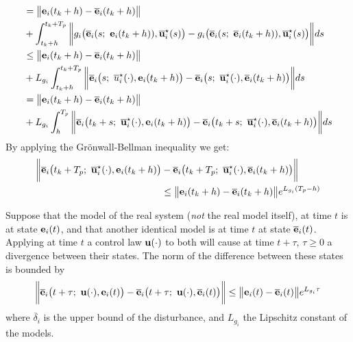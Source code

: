 \begin{gg_box}
\begin{align}
  &= \big \| \vect{e}_i(t_k +h) - \overline{\vect{e}}_i(t_k +h) \big \| \\
  &+ \int_{t_k +h}^{t_k + T_p} \bigg\| g_i\big(\overline{\vect{e}}_i(s;\ \vect{e}_i(t_k + h)), \overline{\vect{u}}_i^{\star}(s)\big)
  - g_i\big(\overline{\vect{e}}_i(s;\ \overline{\vect{e}}_i(t_k + h)), \overline{\vect{u}}_i^{\star}(s)\big) \bigg\| ds \\
  &\leq \big \| \vect{e}_i(t_k +h) - \overline{\vect{e}}_i(t_k +h) \big \| \\
  &+ L_{g_i}\int_{t_k +h}^{t_k + T_p} \bigg\| \overline{\vect{e}}_i\big(s;\ \overline{\vect{}u}_i^{\star}(\cdot), \vect{e}_i(t_k + h) \big)
    - \overline{\vect{e}}_i\big(s;\ \overline{\vect{u}}_i^{\star}(\cdot), \overline{\vect{e}}_i(t_k + h)\big)  \bigg\| ds \\
  &= \big \| \vect{e}_i(t_k +h) - \overline{\vect{e}}_i(t_k +h) \big \| \\
  &+ L_{g_i}\int_{h}^{T_p} \bigg\| \overline{\vect{e}}_i\big(t_k + s;\ \overline{\vect{u}}_i^{\star}(\cdot), \vect{e}_i(t_k + h) \big)
    - \overline{\vect{e}}_i\big(t_k + s;\ \overline{\vect{u}}_i^{\star}(\cdot), \overline{\vect{e}}_i(t_k + h)\big)  \bigg\| ds \\
\end{align}
By applying the Gr\"{o}nwall-Bellman inequality we get:
\begin{align}
  \bigg\| \overline{\vect{e}}_i\big(t_k + T_p;\ \overline{\vect{u}}_i^{\star}(\cdot), \vect{e}_i(t_k +h)\big)
    & - \overline{\vect{e}}_i\big(t_k + T_p;\ \overline{\vect{u}}_i^{\star}(\cdot), \overline{\vect{e}}_i(t_k +h)\big) \bigg\| \\
  & \leq \big \| \vect{e}_i(t_k +h) - \overline{\vect{e}}_i(t_k +h) \big \| e^{L_{g_i}(T_p - h)}
\end{align}
\end{gg_box}


\begin{bw_box}
  \begin{lemma}
    Suppose that the model of the real system (\textit{not} the real model itself),
    at time $t$ is at state $\bm{\mathbf{e}}_i(t)$, and that another identical
    model is at time $t$ at state $\overline{\bm{\mathbf{e}}}_i(t)$. Applying at
    time $t$ a control law $\bm{\mathbf{u}}(\cdot)$ to both will cause at time
    $t + \tau$, $\tau \geq 0$ a divergence between their states.
    The norm of the difference between these states is bounded by
    \begin{align}
      \bigg\| \overline{\bm{\mathbf{e}}}_i\big(t + \tau;\ \bm{\mathbf{u}}(\cdot), \bm{\mathbf{e}}_i(t)\big) -
        \overline{\bm{\mathbf{e}}}_i\big(t + \tau;\ \bm{\mathbf{u}}(\cdot), \overline{\bm{\mathbf{e}}}_i(t)\big) \bigg\|
        \leq \big\| \bm{\mathbf{e}}_i(t) - \overline{\bm{\mathbf{e}}}_i(t) \big\| e^{L_{g_i}\tau}
    \end{align}
    where $\overline{\delta}_i$ is the upper bound of the disturbance,
    and $L_{g_i}$ the Lipschitz constant of the models.
    \label{lemma:diff_state_from_diff_conditions}
  \end{lemma}
\end{bw_box}

